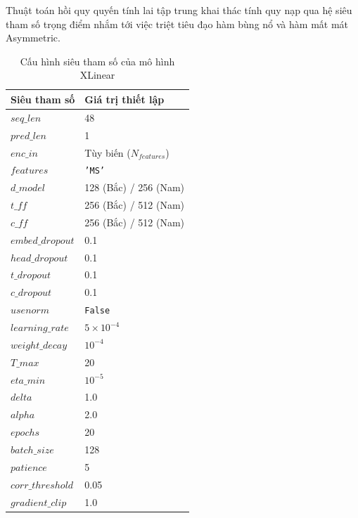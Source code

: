 Thuật toán hồi quy quyến tính lai tập trung khai thác tính quy nạp qua hệ siêu tham số trọng điểm nhắm tới việc triệt tiêu đạo hàm bùng nổ và hàm mất mát Asymmetric.

\begin{table}[h]
    \centering
    \caption{Cấu hình siêu tham số của mô hình XLinear}
    \label{tab:xlinear_params_ch2}
    \renewcommand{\arraystretch}{1.3}
    \begin{tabular}{p{5.5cm} p{8.8cm}}
    \toprule
    \textbf{Siêu tham số} & \textbf{Giá trị thiết lập} \\
    \midrule
    $seq\_len$ & 48 \\
    $pred\_len$ & 1 \\
    $enc\_in$ & Tùy biến ($N_{features}$) \\
    $features$ & \texttt{'MS'} \\
    $d\_model$ & 128 (Bắc) / 256 (Nam) \\
    $t\_ff$ & 256 (Bắc) / 512 (Nam) \\
    $c\_ff$ & 256 (Bắc) / 512 (Nam) \\
    $embed\_dropout$ & 0.1 \\
    $head\_dropout$ & 0.1 \\
    $t\_dropout$ & 0.1 \\
    $c\_dropout$ & 0.1 \\
    $usenorm$ & \texttt{False} \\
    $learning\_rate$ & $5 \times 10^{-4}$ \\
    $weight\_decay$ & $10^{-4}$ \\
    $T\_max$ & 20 \\
    $eta\_min$ & $10^{-5}$ \\
    $delta$ & 1.0 \\
    $alpha$ & 2.0 \\
    $epochs$ & 20 \\
    $batch\_size$ & 128 \\
    $patience$ & 5 \\
    $corr\_threshold$ & 0.05 \\
    $gradient\_clip$ & 1.0 \\
    \bottomrule
    \end{tabular}
\end{table}

